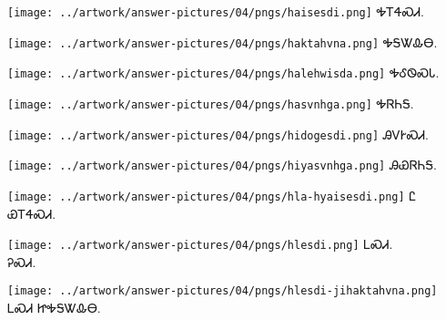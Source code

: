 \documentclass[avery5371,frame]{flashcards}%
\begin{document}
\begin{flashcard}{
\texttt{[image: ../artwork/answer-pictures/04/pngs/haisesdi.png]}
}\Huge ᎭᎢᏎᏍᏗ.
\end{flashcard}

\begin{flashcard}{
\texttt{[image: ../artwork/answer-pictures/04/pngs/haktahvna.png]}
}\Huge ᎭᎦᏔᎲᎾ.
\end{flashcard}

\begin{flashcard}{
\texttt{[image: ../artwork/answer-pictures/04/pngs/halehwisda.png]}
}\Huge ᎭᎴᏫᏍᏓ.
\end{flashcard}

\begin{flashcard}{
\texttt{[image: ../artwork/answer-pictures/04/pngs/hasvnhga.png]}
}\Huge ᎭᏒᏂᎦ.
\end{flashcard}

\begin{flashcard}{
\texttt{[image: ../artwork/answer-pictures/04/pngs/hidogesdi.png]}
}\Huge ᎯᏙᎨᏍᏗ.
\end{flashcard}

\begin{flashcard}{
\texttt{[image: ../artwork/answer-pictures/04/pngs/hiyasvnhga.png]}
}\Huge ᎯᏯᏒᏂᎦ.
\end{flashcard}

\begin{flashcard}{
\texttt{[image: ../artwork/answer-pictures/04/pngs/hla-hyaisesdi.png]}
}\Huge Ꮭ ᏯᎢᏎᏍᏗ.
\end{flashcard}

\begin{flashcard}{
\texttt{[image: ../artwork/answer-pictures/04/pngs/hlesdi.png]}
}\Huge ᏞᏍᏗ.\\ᎮᏍᏗ.
\end{flashcard}

\begin{flashcard}{
\texttt{[image: ../artwork/answer-pictures/04/pngs/hlesdi-jihaktahvna.png]}
}\Huge ᏞᏍᏗ ᏥᎭᎦᏔᎲᎾ.
\end{flashcard}
\end{document}
